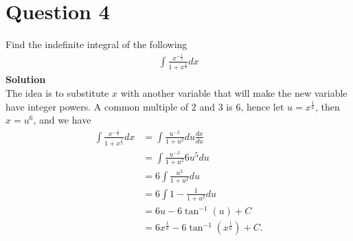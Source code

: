 \documentclass[12pt]{article}
\numberwithin{equation}{subsection}
\begin{document}
\section*{Question 4}
Find the indefinite integral of the following
\begin{align}
\int \frac{x^{-\frac{1}{2}}}{1+x^{\frac{1}{3}}} dx
\end{align}
\textbf{Solution}\\
The idea is to substitute $x$ with another variable that will make the new variable have integer powers. A common multiple of 2 and 3 is 6, hence let $u = x^{\frac{1}{6}}$, then $x = u^6$, and we have 
\begin{align*}
\int \frac{x^{-\frac{1}{2}}}{1+x^{\frac{1}{3}}} dx &= \int \frac{u^{-3}}{1+u^{2}} du\frac{dx}{du}\\
&= \int \frac{u^{-3}}{1+u^{2}}6 u^5du\\
&= 6\int \frac{u^{2}}{1+u^{2}} du\\
&= 6\int 1 - \frac{1}{1+u^{2}} du\\
&= 6u - 6\tan^{-1}(u) + C\\
&= 6x^{\frac{1}{6}} - 6\tan^{-1}(x^{\frac{1}{6}}) + C.
\end{align*}
\end{document}
